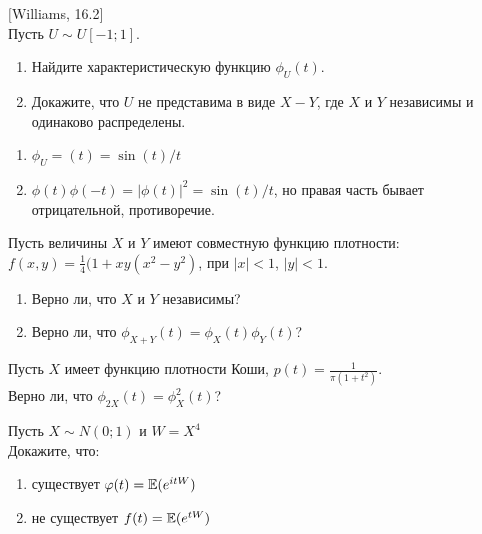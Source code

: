 \begin{problem}
$[$Williams, 16.2$]$ \\
Пусть $U\sim U[-1;1]$.
\begin{enumerate}
\item Найдите характеристическую функцию $\phi_{U}(t)$.
\item Докажите, что $U$ не представима в виде $X-Y$, где $X$ и $Y$ независимы и одинаково распределены.
\end{enumerate}

\begin{sol}


\begin{enumerate}
\item $\phi_{U}=(t)=\sin(t)/t$
\item $\phi(t)\phi(-t)=|\phi(t)|^{2}=\sin(t)/t$, но правая часть
бывает отрицательной, противоречие.
\end{enumerate}
\end{sol}
\end{problem}

\begin{problem}
Пусть величины $X$ и $Y$ имеют совместную функцию плотности: \\
$f(x,y)=\frac{1}{4}(1+xy(x^{2}-y^{2})$, при $|x|<1$, $|y|<1$.
\begin{enumerate}
\item  Верно ли, что $X$ и $Y$ независимы?
\item Верно ли, что $\phi_{X+Y}(t)=\phi_{X}(t)\phi_{Y}(t)$?
\end{enumerate}

\begin{sol}

\end{sol}
\end{problem}

\begin{problem}
Пусть $X$ имеет функцию плотности Коши,
$p(t)=\frac{1}{\pi(1+t^{2})}$. \\
Верно ли, что $\phi_{2X}(t)=\phi_{X}^{2}(t)$?

\begin{sol}

\end{sol}
\end{problem}

\begin{problem}
Пусть $X\sim N(0;1)$ и $W=X^{4}$ \\
Докажите, что:
\begin{enumerate}
\item существует $\varphi(t)=\mathbb{E}(e^{itW})$
\item не существует $f(t)=\mathbb{E}(e^{tW})$
\end{enumerate}

\begin{sol}

\end{sol}
\end{problem}

